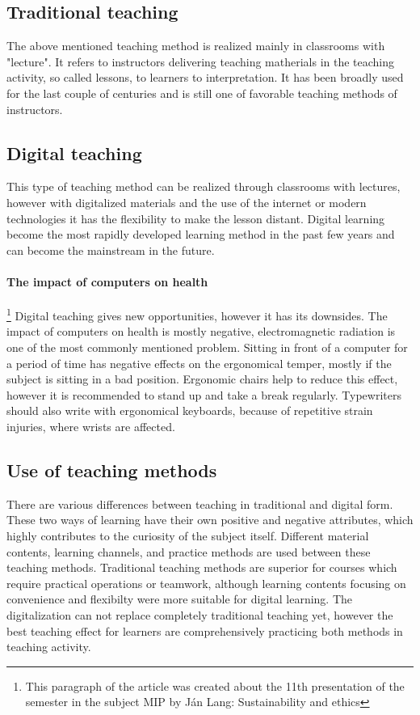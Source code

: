 \documentclass[10pt,oneside,english,a4paper]{article}
\begin{document}
\subsection{Traditional teaching}\label{3.1}

	The above mentioned teaching method is realized mainly in classrooms with "lecture". It refers to instructors delivering teaching matherials in the teaching activity, so called lessons, to learners to interpretation. It has been broadly used for the last couple of centuries and is still one of favorable teaching methods of instructors.\cite{Lin2017}

\subsection{Digital teaching}\label{3.2}

	This type of teaching method can be realized through classrooms with lectures, however with digitalized materials and the use of the internet or modern technologies it has the flexibility to make the lesson distant. Digital learning become the most rapidly developed learning method in the past few years and can become the mainstream in the future.\cite{Lin2017}

\paragraph{The impact of computers on health}\footnote{This paragraph of the article was created about the 11th presentation of the semester in the subject MIP by Ján Lang: Sustainability and ethics} Digital teaching gives new opportunities, however it has its downsides. The impact of computers on health is mostly negative, electromagnetic radiation is one of the most commonly mentioned problem. Sitting in front of a computer for a period of time has negative effects on the ergonomical temper, mostly if the subject is sitting in a bad position. Ergonomic chairs help to reduce this effect, however it is recommended to stand up and take a break regularly. Typewriters should also write with ergonomical keyboards, because of repetitive strain injuries, where wrists are affected.

\subsection{Use of teaching methods}\label{3.3}

	There are various differences between teaching in traditional and digital form. These two ways of learning have their own positive and negative attributes, which highly contributes to the curiosity of the subject itself. Different material contents, learning channels, and practice methods are used between these teaching methods. Traditional teaching methods are superior for courses which require practical operations or teamwork, although learning contents focusing on convenience and flexibilty were more suitable for digital  learning. The digitalization can not replace completely traditional teaching yet, however the best teaching effect for learners are comprehensively practicing both methods in teaching activity.\cite{Lin2017}
\end{document}
